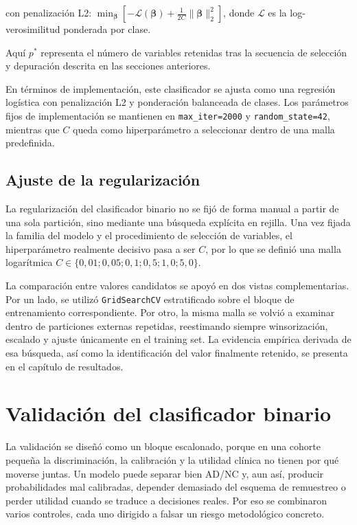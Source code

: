 con penalización L2: $\min_{\boldsymbol{\beta}} \left[ -\mathcal{L}(\boldsymbol{\beta}) + \frac{1}{2C} \|\boldsymbol{\beta}\|_2^2 \right]$, donde $\mathcal{L}$ es la log-verosimilitud ponderada por clase.

Aquí $p^\ast$ representa el número de variables retenidas tras la secuencia de selección y depuración descrita en las
secciones anteriores.

En términos de implementación, este clasificador se ajusta como una regresión logística con penalización L2 y
ponderación balanceada de clases. Los parámetros fijos de implementación se mantienen en \texttt{max\_iter=2000} y
\texttt{random\_state=42}, mientras que $C$ queda como hiperparámetro a seleccionar dentro de una malla predefinida.

\subsection{Ajuste de la regularización}

La regularización del clasificador binario no se fijó de forma manual a partir de una sola partición, sino mediante una
búsqueda explícita en rejilla. Una vez fijada la familia del modelo y el procedimiento de selección de variables, el
hiperparámetro realmente decisivo pasa a ser $C$, por lo que se definió una malla logarítmica
$C \in \{0{,}01;\allowbreak 0{,}05;\allowbreak 0{,}1;\allowbreak 0{,}5;\allowbreak 1{,}0;\allowbreak 5{,}0\}$.

La comparación entre valores candidatos se apoyó en dos vistas complementarias. Por un lado, se utilizó
\texttt{GridSearchCV} estratificado sobre el bloque de entrenamiento correspondiente. Por otro, la misma malla se volvió
a examinar dentro de particiones externas repetidas, reestimando siempre winsorización, escalado y ajuste únicamente en
el training set. La evidencia empírica derivada de esa búsqueda, así como la identificación del valor finalmente
retenido, se presenta en el capítulo de resultados.

\section{Validación del clasificador binario}\label{sec:validacion}

La validación se diseñó como un bloque escalonado, porque en una cohorte pequeña la discriminación, la calibración y la utilidad clínica no tienen por qué moverse juntas. Un modelo puede separar bien AD/NC y, aun así, producir probabilidades mal calibradas, depender demasiado del esquema de remuestreo o perder utilidad cuando se traduce a decisiones reales. Por eso se combinaron varios controles, cada uno dirigido a falsar un riesgo metodológico concreto.

